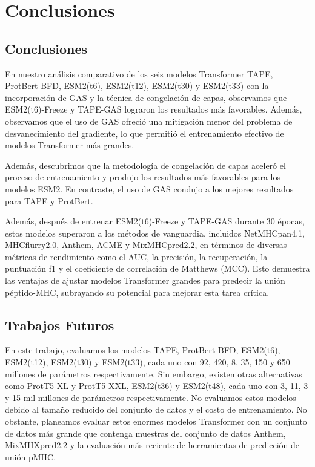 \chapter{Conclusiones}
\label{cap:conclusiones}


\section{Conclusiones}

En nuestro análisis comparativo de los seis modelos Transformer TAPE, ProtBert-BFD, ESM2(t6), ESM2(t12), ESM2(t30) y ESM2(t33) con la incorporación de GAS y la técnica de congelación de capas, observamos que ESM2(t6)-Freeze y TAPE-GAS lograron los resultados más favorables. Además, observamos que el uso de GAS ofreció una mitigación menor del problema de desvanecimiento del gradiente, lo que permitió el entrenamiento efectivo de modelos Transformer más grandes.

Además, descubrimos que la metodología de congelación de capas aceleró el proceso de entrenamiento y produjo los resultados más favorables para los modelos ESM2. En contraste, el uso de GAS condujo a los mejores resultados para TAPE y ProtBert.

Además, después de entrenar ESM2(t6)-Freeze y TAPE-GAS durante 30 épocas, estos modelos superaron a los métodos de vanguardia, incluidos NetMHCpan4.1, MHCflurry2.0, Anthem, ACME y MixMHCpred2.2, en términos de diversas métricas de rendimiento como el AUC, la precisión, la recuperación, la puntuación f1 y el coeficiente de correlación de Matthews (MCC). Esto demuestra las ventajas de ajustar modelos Transformer grandes para predecir la unión péptido-MHC, subrayando su potencial para mejorar esta tarea crítica.



\section{Trabajos Futuros}
En este trabajo, evaluamos los modelos TAPE, ProtBert-BFD, ESM2(t6), ESM2(t12), ESM2(t30) y ESM2(t33), cada uno con 92, 420, 8, 35, 150 y 650 millones de parámetros respectivamente. Sin embargo, existen otras alternativas como ProtT5-XL y ProtT5-XXL, ESM2(t36) y ESM2(t48), cada uno con 3, 11, 3 y 15 mil millones de parámetros respectivamente. No evaluamos estos modelos debido al tamaño reducido del conjunto de datos y el costo de entrenamiento. No obstante, planeamos evaluar estos enormes modelos Transformer con un conjunto de datos más grande que contenga muestras del conjunto de datos Anthem, MixMHXpred2.2 y la evaluación más reciente de herramientas de predicción de unión pMHC.

